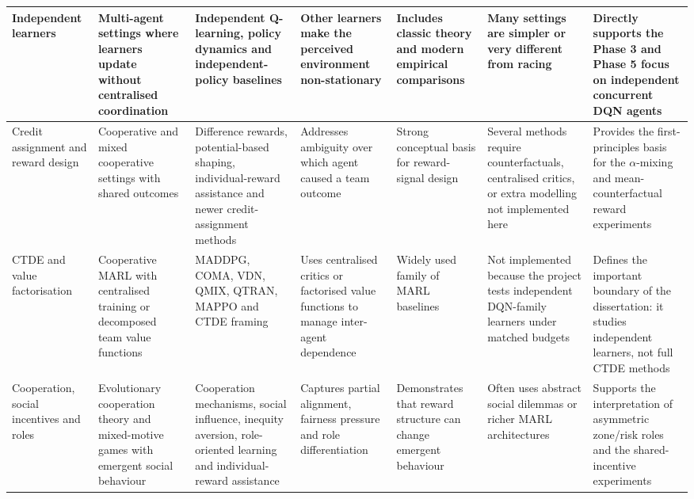\begin{appendices}
\begin{longtable}{|p{2.0cm}|p{2.1cm}|p{2.0cm}|p{2.0cm}|p{2.0cm}|p{2.2cm}|p{2.4cm}|}
\hline
Independent learners \citep{tan1993multiagent,claus1998dynamics,matignon2012independent,foerster2017stabilising,schroeaderdewitt2020ippo} & Multi-agent settings where learners update without centralised coordination & Independent Q-learning, policy dynamics and independent-policy baselines & Other learners make the perceived environment non-stationary & Includes classic theory and modern empirical comparisons & Many settings are simpler or very different from racing & Directly supports the Phase 3 and Phase 5 focus on independent concurrent DQN agents \\
\hline
Credit assignment and reward design \citep{wolpert2001optimal,agogino2004unifying,panait2005cooperative,devlin2014potential,wang2022irat,zhao2025maca,nagpal2025llm_mca} & Cooperative and mixed cooperative settings with shared outcomes & Difference rewards, potential-based shaping, individual-reward assistance and newer credit-assignment methods & Addresses ambiguity over which agent caused a team outcome & Strong conceptual basis for reward-signal design & Several methods require counterfactuals, centralised critics, or extra modelling not implemented here & Provides the first-principles basis for the \(\alpha\)-mixing and mean-counterfactual reward experiments \\
\hline
CTDE and value factorisation \citep{lowe2017maddpg,foerster2018coma,sunehag2018vdn,rashid2018qmix,son2019qtran,yu2022mappo,amato2024ctde_intro} & Cooperative MARL with centralised training or decomposed team value functions & MADDPG, COMA, VDN, QMIX, QTRAN, MAPPO and CTDE framing & Uses centralised critics or factorised value functions to manage inter-agent dependence & Widely used family of MARL baselines & Not implemented because the project tests independent DQN-family learners under matched budgets & Defines the important boundary of the dissertation: it studies independent learners, not full CTDE methods \\
\hline
Cooperation, social incentives and roles \citep{nowak2006five,leibo2017multiagent,hughes2018inequity,jaques2019social,wang2020roma,wang2022irat} & Evolutionary cooperation theory and mixed-motive games with emergent social behaviour & Cooperation mechanisms, social influence, inequity aversion, role-oriented learning and individual-reward assistance & Captures partial alignment, fairness pressure and role differentiation & Demonstrates that reward structure can change emergent behaviour & Often uses abstract social dilemmas or richer MARL architectures & Supports the interpretation of asymmetric zone/risk roles and the shared-incentive experiments \\

\end{longtable}
\end{appendices}
